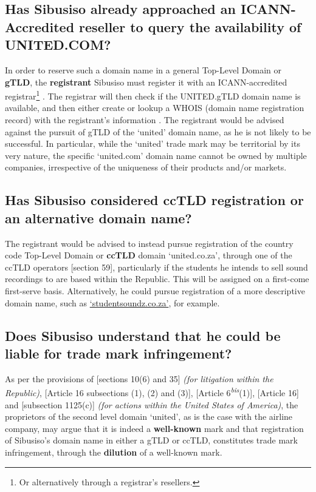 \documentclass[11pt]{article}
\begin{document}
\subsection{Has Sibusiso already approached an ICANN-Accredited reseller to query the availability of UNITED.COM?}
\label{sec:orge6fee01}
In order to reserve such a domain name in a general Top-Level Domain or \textbf{gTLD},
the \textbf{registrant} Sibusiso must register it with an ICANN-accredited
registrar\footnote{Or alternatively through a registrar's resellers.}
\cite{icann13_rules}. The registrar will then check if the UNITED.gTLD domain name
is available, and then either create or lookup a WHOIS (domain name registration
record) with the registrant's information \cite{icann99_policy}. The registrant would be advised
against the pursuit of gTLD of the `united' domain name, as he is not likely to
be successful. In particular, while the `united' trade mark may be territorial by
its very nature, the specific `united.com' domain name cannot be owned by
multiple companies, irrespective of the uniqueness of their products and/or
markets.

\subsection{Has Sibusiso considered ccTLD registration or an alternative domain name?}
\label{sec:orgb483336}
The registrant would be advised to instead pursue registration of the country
code Top-Level Domain or \textbf{ccTLD} domain `united.co.za', through one of the ccTLD
operators [section 59]\cite{rsa02_elect_comm_trans_act}, particularly if the
students he intends to sell sound recordings to are based within the Republic.
This will be assigned on a first-come first-serve basis. Alternatively, he could
pursue registration of a more descriptive domain name, such as
\uline{`studentsoundz.co.za'}, for example.

\subsection{Does Sibusiso understand that he could be liable for trade mark infringement?}
\label{sec:org0924391}
As per the provisions of [sections 10(6) and 35]\cite{rsa93_tm_act} \emph{(for
litigation within the Republic)}, [Article 16 subsections (1), (2) and
(3)]\cite{wto17_trips}, [Article
6\textsuperscript{\textit{bis}}(1)]\cite{wipo83_paris_conve_protect_ip},
[Article 16]\cite{wipo70_tlt} and [subsection 1125(c)]\cite{usa46_title15_ch22}
\emph{(for actions within the United States of America)}, the proprietors of the
second level domain `united', as is the case with the airline company, may argue
that it is indeed a \textbf{well-known} mark and that registration of Sibusiso's domain
name in either a gTLD or ccTLD, constitutes trade mark infringement, through the
\textbf{dilution} of a well-known mark.
\end{document}
